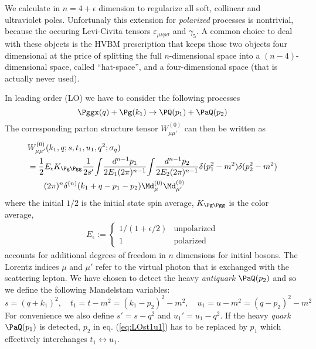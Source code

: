 We calculate in $n=4+\epsilon$ dimension to regularize all soft, collinear and ultraviolet poles. Unfortunaly this extension for \textit{polarized} processes is nontrivial, because the occuring Levi-Civita tensors $\varepsilon_{\mu\nu\rho\sigma}$ and $\gamma_5$. A common choice to deal with these objects is the HVBM prescription\cite{breitenlohner1977} that keeps those two objects four dimensional at the price of splitting the full $n$-dimensional space into a $(n-4)$-dimensional space, called \enquote{hat-space}, and a four-dimensional space (that is actually never used).

In leading order (LO) we have to consider the following processes
\begin{equation}
\Pggx(q) + \Pg(k_1) \rightarrow \PQ(p_1)+\PaQ(p_2)
\end{equation}
The corresponding parton structure tensor $W_{\mu\mu'}^{(0)}$ can then be written as
\begin{align}
&W_{\mu\mu'}^{(0)}(k_1,q;s,t_1,u_1,q^2;\sigma_{q})\nonumber\\
 &= \frac 1 2 E_\epsilon K_{\Pg\Pgg}\frac{1}{2s'}\!\int\!\frac{d^{n-1}p_1}{2E_1(2\pi)^{n-1}}\!\int\!\frac{d^{n-1}p_2}{2E_2(2\pi)^{n-1}}\delta(p_1^2-m^2) \delta(p_2^2-m^2)\nonumber\\
 &\hspace{20pt}(2\pi)^n\delta^{(n)}(k_1+q-p_1-p_2) \Md_{\mu}^{(0)}\Md_{\mu'}^{(0)}
\label{eq:PartonicStructureTensor0}\end{align}
where the initial $1/2$ is the initial state spin average, $K_{\Pg\Pgg}$ is the color average,
\begin{align}
E_\epsilon := \left\{\begin{array}{ll}
1/(1+\epsilon/2) &\text{unpolarized}\\
1 &\text{polarized}
\end{array}\right.
\end{align}
accounts for additional degrees of freedom in $n$ dimensions for initial bosons. The Lorentz indices $\mu$ and $\mu'$ refer to the virtual photon that is exchanged with the scattering lepton. We have chosen to detect the heavy \textit{antiquark} $\PaQ(p_2)$ and so we define the following Mandelstam variables:
\begin{equation}
s = (q+k_1)^2, \quad t_1=t-m^2=(k_1-p_2)^2-m^2, \quad u_1 = u - m^2 = (q-p_2)^2 -m^2 \label{eq:LOst1u1}
\end{equation}
For convenience we also define $s' = s-q^2$ and $u_1' = u_1 - q^2$. If the heavy \textit{quark} $\PaQ(p_1)$ is detected, $p_2$ in eq. (\ref{eq:LOst1u1}) has to be replaced by $p_1$ which effectively interchanges $t_1\leftrightarrow u_1$.

